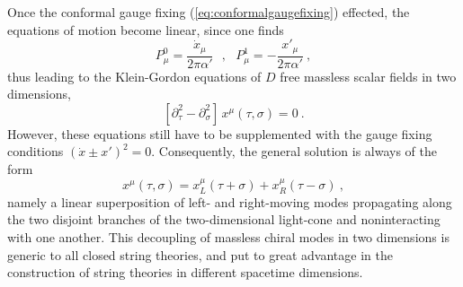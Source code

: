 \documentclass[a4paper,11pt]{article}
\begin{document}
Once the conformal gauge fixing (\ref{eq:conformalgaugefixing}) effected,
the equations of motion become linear, since one finds
\begin{equation}
P^0_\mu=\frac{\dot{x}_\mu}{2\pi\alpha'}\ \ \ ,\ \ \ 
P^1_\mu=-\frac{x'_\mu}{2\pi\alpha'}\ ,
\end{equation}
thus leading to the Klein-Gordon equations of $D$ free massless scalar 
fields in two dimensions,
\begin{equation}
\left[\partial^2_\tau-\partial^2_\sigma\right]\,x^\mu(\tau,\sigma)=0\ .
\end{equation}
However, these equations still have to be supplemented with the
gauge fixing conditions $(\dot{x}\pm x')^2=0$. Consequently, the general
solution is always of the form
\begin{equation}
x^\mu(\tau,\sigma)=x^\mu_L(\tau+\sigma)+x^\mu_R(\tau-\sigma)\ ,
\end{equation}
namely a linear superposition of left- and right-moving modes
propagating along the two disjoint branches of the
two-dimensional light-cone and noninteracting
with one another. This decoupling of massless chiral modes in two dimensions
is generic to all closed string theories, and put to great advantage in
the construction of string theories in different spacetime 
dimensions.\cite{Pol,GSW}
\end{document}
